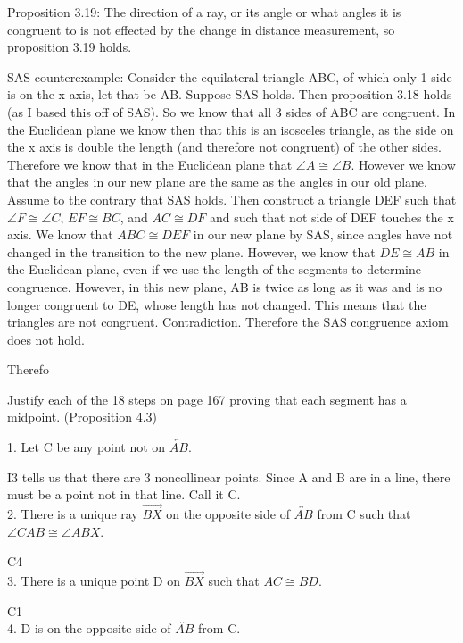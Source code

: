 \documentclass[12pt,letterpaper]{article}
\newcommand{\prob}[1]{\newpage\noindent {\bf #1}}
\begin{document}
Proposition 3.19:
The direction of a ray, or its angle or what angles it is congruent to is not effected by the change in distance measurement, so proposition 3.19 holds.


SAS counterexample:  Consider the equilateral triangle ABC, of which only 1 side is on the x axis, let that be AB.  Suppose SAS holds.  Then proposition 3.18 holds (as I based this off of SAS).  So we know that all 3 sides of ABC are congruent.  In the Euclidean plane we know then that this is an isosceles triangle, as the side on the x axis is double the length (and therefore not congruent) of the other sides.  Therefore we know that in the Euclidean plane that $\angle A \cong \angle B$.  However we know that the angles in our new plane are the same as the angles in our old plane.  Assume to the contrary that SAS holds.  Then construct a triangle DEF such that $\angle F \cong \angle C$, $EF \cong BC$, and $AC \cong DF$ and such that not side of DEF touches the x axis.  We know that $ABC \cong DEF$ in our new plane by SAS, since angles have not changed in the transition to the new plane.  However, we know that $DE\cong AB$ in the Euclidean plane, even if we use the length of the segments to determine congruence.  However, in this new plane, AB is twice as long as it was and is no longer congruent to DE, whose length has not changed.  This means that the triangles are not congruent.  Contradiction.  Therefore the SAS congruence axiom does not hold.

Therefo


\prob{5 (first part only)} Justify each of the 18 steps on page 167 proving that each segment has a midpoint.  (Proposition 4.3)

1. Let C be any point not on $\overleftrightarrow{AB}$.

I3 tells us that there are 3 noncollinear points.  Since A and B are in a line, there must be a point not in that line.  Call it C.\\


2. There is a unique ray $\overrightarrow{BX}$ on the opposite side of $\overleftrightarrow{AB}$ from C such that $\angle CAB \cong \angle ABX$.

C4 \\


3. There is a unique point D on $\overrightarrow{BX}$ such that $AC \cong BD$.  

C1 \\


4. D is on the opposite side of $\overleftrightarrow{AB}$ from C.
\end{document}
